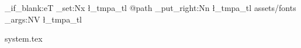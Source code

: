 
\RequirePackage{expl3}
\RequirePackage{xparse}
\RequirePackage{import}

\makeatletter
\providecommand{\NextSystemRoot}{}
\ifx@path\@undefined
  \edef\NextSystemRoot{./}
\else
  \edef\NextSystemRoot{@path}
\fi
\makeatother

\providecommand{\CatalogFontRoot}{}
  {\def\CatalogFontRoot{#1}}

\ExplSyntaxOn
\tl_if_blank:eT { \CatalogFontRoot }
  {
    \tl_set:Nx \l_tmpa_tl { \NextSystemRoot }
    \tl_put_right:Nn \l_tmpa_tl { assets/fonts }
    \exp_args:NV \SetCatalogFontRoot \l_tmpa_tl
  }
\ExplSyntaxOff

{system.tex}
